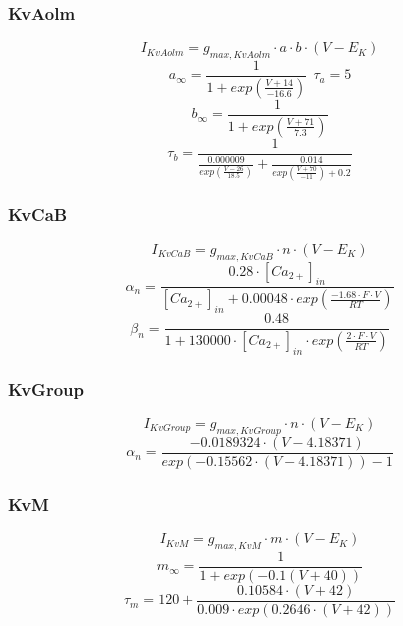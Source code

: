\documentclass[12pt]{article}
\begin{document}
\subsubsection{KvAolm}
\begin{equation}
I_{KvAolm} = g_{max, KvAolm} \cdot a \cdot b \cdot (V - E_K)
\end{equation}
\begin{equation}
a_{\infty} = \frac{1}{1 + exp(\frac{V + 14}{-16.6})  } \ \ \tau_a = 5
\end{equation}
\begin{equation}
b_{\infty} = \frac{1}{1 + exp(\frac{V + 71}{7.3})  }
\end{equation}
\begin{equation}
\tau_b = \frac{1}{\frac{0.000009}{exp(\frac{V - 26}{18.5})}  + \frac{0.014}{exp(\frac{V +70}{-11}) + 0.2} }
\end{equation}

\subsubsection{KvCaB}
\begin{equation}
I_{KvCaB} = g_{max, KvCaB} \cdot n \cdot (V - E_K)
\end{equation}
\begin{equation}
\alpha_n = \frac{0.28 \cdot [Ca_{2+}]_{in} }{ [Ca_{2+}]_{in} + 0.00048 \cdot exp(\frac{-1.68 \cdot F \cdot V}{RT})  } 
\end{equation}
\begin{equation}
\beta_n = \frac{0.48}{1 + 130000 \cdot [Ca_{2+}]_{in} \cdot exp(\frac{2 \cdot F \cdot V}{RT})}
\end{equation}
\subsubsection{KvGroup}
\begin{equation}
I_{KvGroup} = g_{max, KvGroup} \cdot n \cdot (V - E_K)
\end{equation}
\begin{equation}
\alpha_n = \frac{-0.0189324 \cdot (V - 4.18371) }{exp(-0.15562\cdot (V - 4.18371)) - 1}
\end{equation}

\subsubsection{KvM}
\begin{equation}
I_{KvM} = g_{max, KvM} \cdot m \cdot (V - E_K)
\end{equation}
\begin{equation}
m_{\infty} = \frac{1}{1 + exp(-0.1(V + 40)) }
\end{equation}
\begin{equation}
\tau_{m} = 120 + \frac{0.10584 \cdot (V + 42)}{0.009 \cdot exp(0.2646 \cdot (V + 42)) }
\end{equation}
\end{document}
